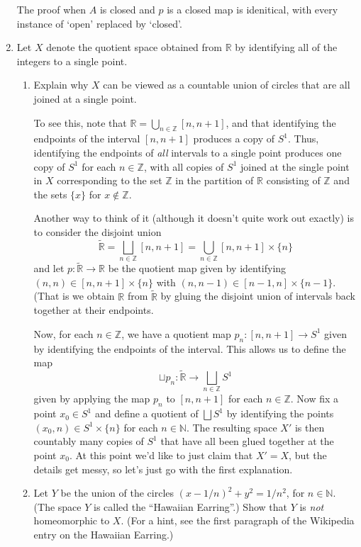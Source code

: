 \documentclass[letterpaper,12pt]{article}
\newcommand{\R}{\mathbb{R}}
\newcommand{\N}{\mathbb{N}}
\newcommand{\Z}{\mathbb{Z}}
\begin{document}
\begin{enumerate}
The proof when $A$ is closed and $p$ is a closed map is idenitical, with every instance of `open' replaced by `closed'.

\bigskip

\item Let $X$ denote the quotient space obtained from $\R$ by identifying all of the integers to a single point.
\begin{enumerate}
 \item Explain why $X$ can be viewed as a countable union of circles that are all joined at a single point.

\bigskip

To see this, note that $\R = \bigcup_{n\in\Z}[n,n+1]$, and that identifying the endpoints of the interval $[n,n+1]$ produces a copy of $S^1$. Thus, identifying the endpoints of {\em all} intervals to a single point produces one copy of $S^1$ for each $n\in \Z$, with all copies of $S^1$ joined at the single point in $X$ corresponding to the set $\Z$ in the partition of $\R$ consisting of $\Z$ and the sets $\{x\}$ for $x\notin \Z$.

Another way to think of it (although it doesn't quite work out exactly) is to consider the disjoint union
\[
 \tilde{\R} = \bigsqcup_{n\in\Z}[n,n+1] = \bigcup_{n\in\Z}[n,n+1]\times\{n\}
\]
and let $p:\tilde{\R}\to\R$ be the quotient map given by identifying $(n,n)\in [n,n+1]\times\{n\}$ with $(n,n-1)\in [n-1,n]\times\{n-1\}$. (That is we obtain $\R$ from $\tilde{\R}$ by gluing the disjoint union of intervals back together at their endpoints.

Now, for each $n\in \Z$, we have a quotient map $p_n:[n,n+1]\to S^1$ given by identifying the endpoints of the interval. This allows us to define the map
\[
 \sqcup p_n: \tilde{\R} \to \bigsqcup_{n\in\Z}S^1
\]
given by applying the map $p_n$ to $[n,n+1]$ for each $n\in \Z$. Now fix a point $x_0\in S^1$ and define a quotient of $\bigsqcup S^1$ by identifying the points $(x_0,n)\in S^1\times \{n\}$ for each $n\in \N$. The resulting space $X'$ is then countably many copies of $S^1$ that have all been glued together at the point $x_0$. At this point we'd like to just claim that $X'=X$, but the details get messy, so let's just go with the first explanation.

\bigskip

 \item Let $Y$ be the union of the circles $(x-1/n)^2+y^2=1/n^2$, for $n\in \N$. (The space $Y$ is called the ``Hawaiian Earring''.) Show that $Y$ is {\em not} homeomorphic to $X$. (For a hint, see the first paragraph of the Wikipedia entry on the Hawaiian Earring.)
 

\end{enumerate}
\end{enumerate}
\end{document}
